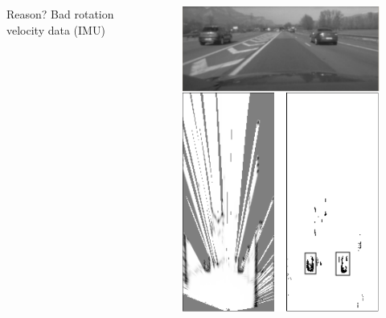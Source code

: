 \documentclass{beamer}
\begin{document}
\begin{frame}
\begin{columns}[t]
\begin{column}[t]{5cm}
				\begin{block}{Reason?}
				Bad rotation velocity data (IMU)
				\end{block}		
			\end{column}
			\begin{column}[t]{5cm}
				\begin{figure}[h]
				\center
				\includegraphics[scale=0.55]{../img/fig:result:scenetwocarshighway}
				\end{figure}
			\end{column}
		\end{columns}		

	\end{frame}
	
\end{document}
